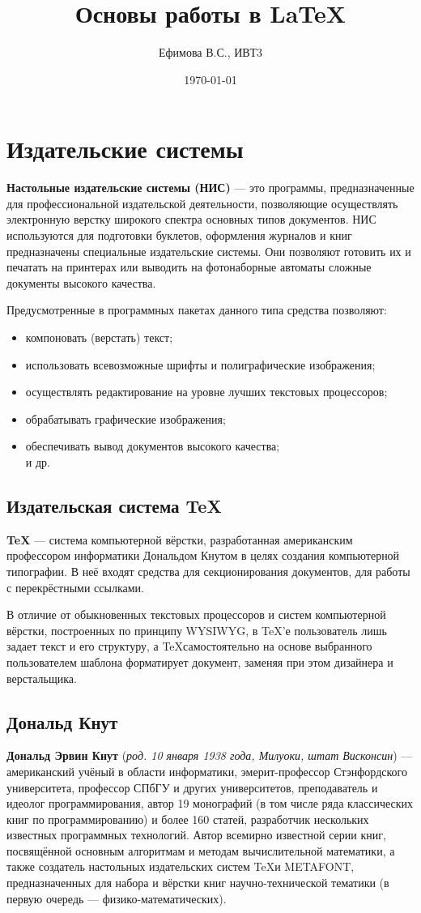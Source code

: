 \documentclass[a4paper,12pt]{article} %
\author{Ефимова В.С., ИВТ3}
\title{Основы работы в \LaTeX{}}
\date{\today}
\begin{document}
\maketitle
\newpage
\section{Издательские системы}
\textbf{Настольные издательские системы (НИС)} — это программы, предназначенные для профессиональной издательской деятельности, позволяющие осуществлять электронную верстку широкого спектра основных типов документов. НИС используются для подготовки буклетов, оформления журналов и книг предназначены специальные издательские системы. Они позволяют готовить их и печатать на принтерах или выводить на фотонаборные автоматы сложные документы высокого качества.

Предусмотренные в программных пакетах данного типа средства позволяют:
\begin{itemize}
\item компоновать (верстать) текст;
\item использовать всевозможные шрифты и полиграфические изображения;
\item осуществлять редактирование на уровне лучших текстовых процессоров;
\item обрабатывать графические изображения;
\item обеспечивать вывод документов высокого качества;\\
и др.
\end{itemize}

\subsection{Издательская система \TeX}
\textbf{\TeX} — система компьютерной вёрстки, разработанная американским профессором информатики Дональдом Кнутом в целях создания компьютерной типографии. В неё входят средства для секционирования документов, для работы с перекрёстными ссылками.

В отличие от обыкновенных текстовых процессоров и систем компьютерной вёрстки, построенных по принципу WYSIWYG, в \TeX ’е пользователь лишь задает текст и его структуру, а \TeX самостоятельно на основе выбранного пользователем шаблона форматирует документ, заменяя при этом дизайнера и верстальщика.
\subsection{Дональд Кнут}
\textbf{Дональд Эрвин Кнут} (\textit{род. 10 января 1938 года, Милуоки, штат Висконсин}) — американский учёный в области информатики, эмерит-профессор Стэнфордского университета, профессор СПбГУ и других университетов, преподаватель и идеолог программирования, автор 19 монографий (в том числе ряда классических книг по программированию) и более 160 статей, разработчик нескольких известных программных технологий. Автор всемирно известной серии книг, посвящённой основным алгоритмам и методам вычислительной математики, а также создатель настольных издательских систем \TeX  и METAFONT, предназначенных для набора и вёрстки книг научно-технической тематики (в первую очередь — физико-математических).
\end{document}
